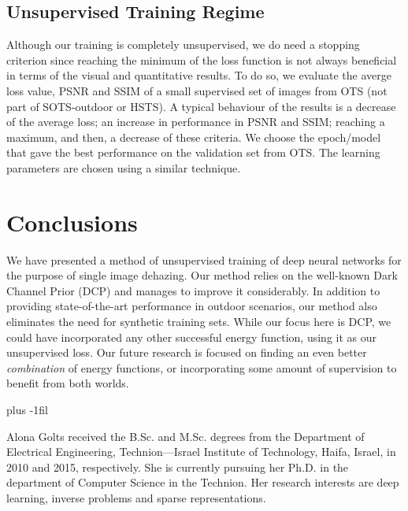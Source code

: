 \documentclass[10pt,twocolumn,twoside]{IEEEtran}
\begin{document}
\subsection{Unsupervised Training Regime}\label{stopping_criterion}
Although our training is completely unsupervised, we do need a stopping criterion since reaching the minimum of the loss function is not always beneficial in terms of the visual and quantitative results. To do so, we evaluate the averge loss value, PSNR and SSIM of a small supervised set of  images from OTS (not part of SOTS-outdoor or HSTS). A typical behaviour of the results is a decrease of the average loss; an increase in performance in PSNR and SSIM; reaching a maximum, and then, a decrease of these criteria. We choose the epoch/model that gave the best performance on the validation set from OTS. The learning parameters are chosen using a similar technique.

\section{Conclusions}\label{conclusions}
We have presented a method of unsupervised training of deep neural networks for the purpose of single image dehazing. Our method relies on the well-known Dark Channel Prior (DCP) \cite{DCP} and manages to improve it considerably. In addition to providing state-of-the-art performance in outdoor scenarios, our method also eliminates the need for synthetic training sets. While our focus here is DCP, we could have incorporated any other successful energy function, using it as our unsupervised loss. Our future research is focused on finding an even better \textit{combination} of energy functions, or incorporating some amount of supervision to benefit from both worlds.




\vskip -20pt plus -1fil

\begin{IEEEbiography}{Alona Golts}
received the B.Sc. and M.Sc. degrees from the Department of Electrical Engineering, Technion—Israel Institute of Technology, Haifa, Israel, in 2010 and 2015, respectively. She is
currently pursuing her Ph.D. in the department of Computer Science in the Technion. Her research interests are deep learning, inverse problems and sparse representations.
\end{IEEEbiography}
\end{document}
